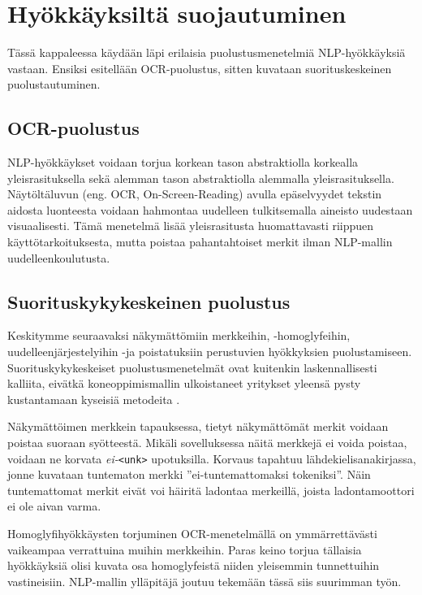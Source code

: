 \chapter{Hyökkäyksiltä suojautuminen\label{discussion}}

Tässä kappaleessa käydään läpi erilaisia puolustusmenetelmiä NLP-hyökkäyksiä vastaan. Ensiksi esitellään OCR-puolustus, sitten kuvataan suorituskeskeinen puolustautuminen.

\section{OCR-puolustus}
NLP-hyökkäykset voidaan torjua korkean tason abstraktiolla korkealla yleisrasituksella sekä alemman tason abstraktiolla alemmalla yleisrasituksella. Näytöltäluvun (eng. OCR, On-Screen-Reading) avulla epäselvyydet tekstin aidosta luonteesta voidaan hahmontaa uudelleen tulkitsemalla aineisto uudestaan visuaalisesti. Tämä menetelmä lisää yleisrasitusta huomattavasti riippuen käyttötarkoituksesta, mutta poistaa pahantahtoiset merkit ilman NLP-mallin uudelleenkoulutusta. \citep{boucher2021bad}

\section{Suorituskykykeskeinen puolustus}
Keskitymme seuraavaksi näkymättömiin merkkeihin, -homoglyfeihin, \-uudelleenjärjestelyihin -ja poistatuksiin perustuvien hyökkyksien puolustamiseen. Suorituskykykeskeiset puolustusmenetelmät ovat kuitenkin laskennallisesti kalliita, eivätkä koneoppimismallin ulkoistaneet yritykset yleensä pysty kustantamaan kyseisiä metodeita \citep{https://doi.org/10.48550/arxiv.1911.07399}.

Näkymättöimen merkkein tapauksessa, tietyt näkymättömät merkit voidaan poistaa suoraan syötteestä. Mikäli sovelluksessa näitä merkkejä ei voida poistaa, voidaan ne korvata \textit{ei-}\texttt{<unk>} upotuksilla. Korvaus tapahtuu lähdekielisanakirjassa, jonne kuvataan tuntematon merkki ''ei-tuntemattomaksi tokeniksi''. Näin tuntemattomat merkit eivät voi häiritä ladontaa merkeillä, joista ladontamoottori ei ole aivan varma. \citep{boucher2021bad}

Homoglyfihyökkäysten torjuminen OCR-menetelmällä on ymmärrettävästi vaikeampaa verrattuina muihin merkkeihin. Paras keino torjua tällaisia hyökkäyksiä olisi kuvata osa homoglyfeistä niiden yleisemmin tunnettuihin vastineisiin. NLP-mallin ylläpitäjä joutuu tekemään tässä siis suurimman työn. \citep{boucher2021bad}

